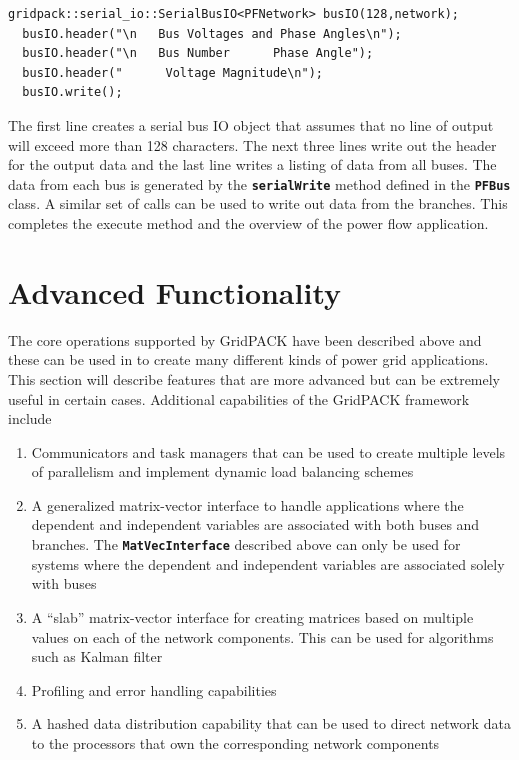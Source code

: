 \documentclass[12pt]{report} %
\begin{document}
{
\color{red}
\begin{Verbatim}[fontseries=b]
  gridpack::serial_io::SerialBusIO<PFNetwork> busIO(128,network);
  busIO.header("\n   Bus Voltages and Phase Angles\n");
  busIO.header("\n   Bus Number      Phase Angle");
  busIO.header("      Voltage Magnitude\n");
  busIO.write();
\end{Verbatim}
}

The first line creates a serial bus IO object that assumes that no line of output will exceed more than 128 characters. The next three lines write out the header for the output data and the last line writes a listing of data from all buses. The data from each bus is generated by the \texttt{\textbf{serialWrite}} method defined in the \texttt{\textbf{PFBus}} class. A similar set of calls can be used to write out data from the branches. This completes the execute method and the overview of the power flow application.

\chapter{Advanced Functionality}

The core operations supported by GridPACK have been described above and these can be used in to create many different kinds of power grid applications. This section will describe features that are more advanced but can be extremely useful in certain cases. Additional capabilities of the GridPACK framework include
\begin{enumerate}
\item  Communicators and task managers that can be used to create multiple levels of parallelism and implement dynamic load balancing schemes

\item  A generalized matrix-vector interface to handle applications where the dependent and independent variables are associated with both buses and branches. The \texttt{\textbf{MatVecInterface}} described above can only be used for systems where the dependent and independent variables are associated solely with buses

\item  A ``slab'' matrix-vector interface for creating matrices based on multiple values on each of the network components. This can be used for algorithms such as Kalman filter

\item  Profiling and error handling capabilities

\item  A hashed data distribution capability that can be used to direct network data to the processors that own the corresponding network components
\end{enumerate}
\end{document}
